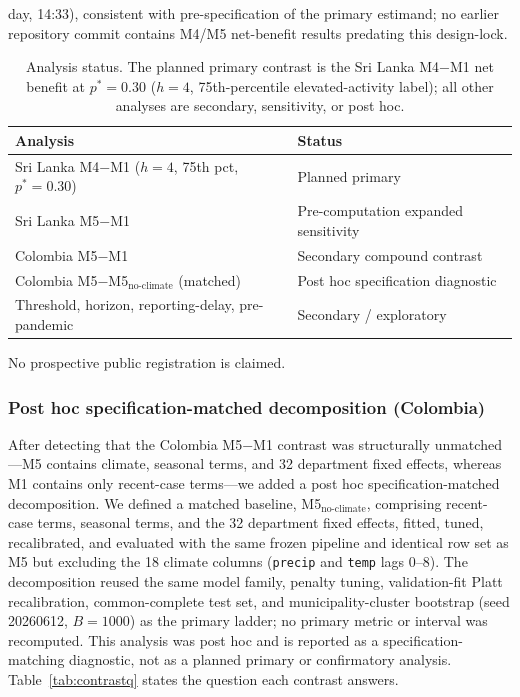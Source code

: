 \documentclass[11pt,a4paper]{article}
\begin{document}
day, 14:33), consistent with pre-specification of the primary estimand; no earlier repository commit contains M4/M5 net-benefit results predating this design-lock.

\begin{table}[htbp]
\centering
\caption{Analysis status. The planned primary contrast is the Sri Lanka M4$-$M1 net benefit at $p^*=0.30$ ($h=4$, 75th-percentile elevated-activity label); all other analyses are secondary, sensitivity, or post hoc.}
\label{tab:analysisstatus}
\begin{tabular}{ll}
\hline
Analysis & Status \\
\hline
Sri Lanka M4$-$M1 ($h=4$, 75th pct, $p^*=0.30$) & Planned primary \\
Sri Lanka M5$-$M1 & Pre-computation expanded sensitivity \\
Colombia M5$-$M1 & Secondary compound contrast \\
Colombia M5$-$M5$_{\text{no-climate}}$ (matched) & Post hoc specification diagnostic \\
Threshold, horizon, reporting-delay, pre-pandemic & Secondary / exploratory \\
\hline
\end{tabular}
\end{table} No prospective public registration is claimed.

\subsubsection*{Post hoc specification-matched decomposition (Colombia)}
After detecting that the Colombia M5$-$M1 contrast was structurally unmatched---M5 contains climate, seasonal terms, and 32 department fixed effects, whereas M1 contains only recent-case terms---we added a post hoc specification-matched decomposition. We defined a matched baseline, M5$_{\text{no-climate}}$, comprising recent-case terms, seasonal terms, and the 32 department fixed effects, fitted, tuned, recalibrated, and evaluated with the same frozen pipeline and identical row set as M5 but excluding the 18 climate columns (\texttt{precip} and \texttt{temp} lags 0--8). The decomposition reused the same model family, penalty tuning, validation-fit Platt recalibration, common-complete test set, and municipality-cluster bootstrap (seed 20260612, $B=1000$) as the primary ladder; no primary metric or interval was recomputed. This analysis was post hoc and is reported as a specification-matching diagnostic, not as a planned primary or confirmatory analysis. Table~\ref{tab:contrastq} states the question each contrast answers.
\end{document}

